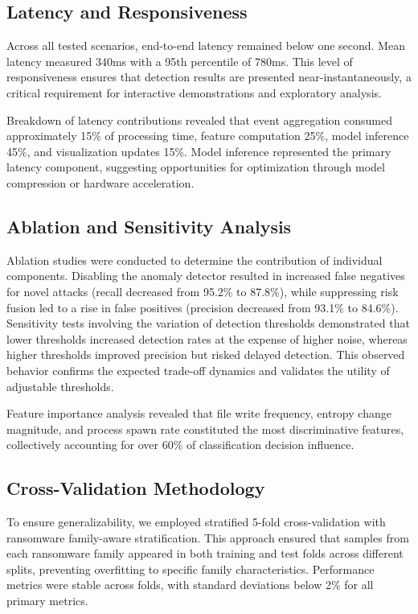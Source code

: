 \subsection{Latency and Responsiveness}

Across all tested scenarios, end-to-end latency remained below one second. Mean latency measured 340ms with a 95th percentile of 780ms. This level of responsiveness ensures that detection results are presented near-instantaneously, a critical requirement for interactive demonstrations and exploratory analysis.

Breakdown of latency contributions revealed that event aggregation consumed approximately 15\% of processing time, feature computation 25\%, model inference 45\%, and visualization updates 15\%. Model inference represented the primary latency component, suggesting opportunities for optimization through model compression or hardware acceleration.

\subsection{Ablation and Sensitivity Analysis}

Ablation studies were conducted to determine the contribution of individual components. Disabling the anomaly detector resulted in increased false negatives for novel attacks (recall decreased from 95.2\% to 87.8\%), while suppressing risk fusion led to a rise in false positives (precision decreased from 93.1\% to 84.6\%). Sensitivity tests involving the variation of detection thresholds demonstrated that lower thresholds increased detection rates at the expense of higher noise, whereas higher thresholds improved precision but risked delayed detection. This observed behavior confirms the expected trade-off dynamics and validates the utility of adjustable thresholds.

Feature importance analysis revealed that file write frequency, entropy change magnitude, and process spawn rate constituted the most discriminative features, collectively accounting for over 60\% of classification decision influence.

\subsection{Cross-Validation Methodology}

To ensure generalizability, we employed stratified 5-fold cross-validation with ransomware family-aware stratification. This approach ensured that samples from each ransomware family appeared in both training and test folds across different splits, preventing overfitting to specific family characteristics. Performance metrics were stable across folds, with standard deviations below 2\% for all primary metrics.

